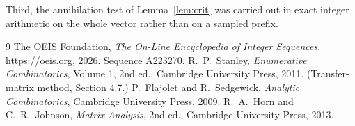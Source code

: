 \documentclass[11pt,a4paper]{article}
\theoremstyle{plain}
\theoremstyle{definition}
\begin{document}
Third, the annihilation test of Lemma~\ref{lem:crit} was carried out in exact integer
arithmetic on the whole vector rather than on a sampled prefix.

\begin{thebibliography}{9}
 The OEIS Foundation, \emph{The On-Line Encyclopedia of Integer
Sequences}, \url{https://oeis.org}, 2026. Sequence A223270.
 R.~P.~Stanley, \emph{Enumerative Combinatorics}, Volume 1, 2nd ed.,
Cambridge University Press, 2011. (Transfer-matrix method, Section 4.7.)
 P.~Flajolet and R.~Sedgewick, \emph{Analytic Combinatorics}, Cambridge
University Press, 2009.
 R.~A.~Horn and C.~R.~Johnson, \emph{Matrix Analysis}, 2nd ed., Cambridge
University Press, 2013.
\end{thebibliography}
\end{document}
